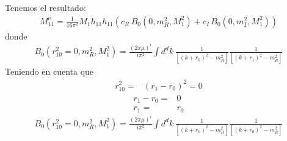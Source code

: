 \documentclass[12pt]{article}
\begin{document}
Tenemos el resultado:
\begin{align}
  M^\nu_{11}= \frac{1}{16\pi^2}
  M_1 h_{11}h_{11}\left(c_R \,B_0(0,m_R^2,M_1^2)+
c_I \,B_0(0,m_I^2,M_1^2)  \right)
\end{align}
donde
\begin{align}
  B_0(r_{10}^2=0,m_R^2,M_1^2)=\frac{\left(2\pi\mu\right)^\epsilon}{i\pi^2}
\int d^dk\,\frac{1}{\left[(k+r_0)^2-m_R^2\right]}
\frac{1}{\left[(k+r_1)^2-m_R^2\right]}
\end{align}
Teniendo en cuenta que
\begin{align}
  r_{10}^2=&\left(r_1-r_0\right)^2=0
\end{align}
\begin{align}
  r_1-r_0=&0\nonumber\\
  r_1=&r_0
\end{align}
\begin{align}
  B_0(r_{10}^2=0,m_R^2,M_1^2)=\frac{\left(2\pi\mu\right)^\epsilon}{i\pi^2}
\int d^dk\,\frac{1}{\left[(k+r_0)^2-m_R^2\right]}
\frac{1}{\left[(k+r_0)^2-m_R^2\right]}
\end{align}

\end{document}
